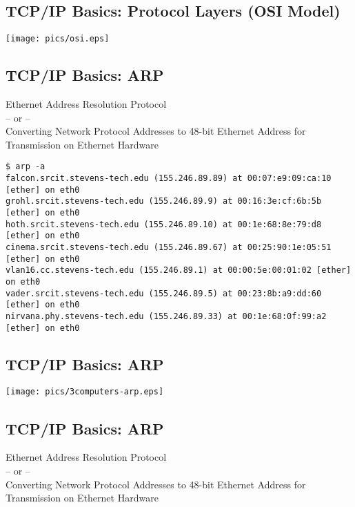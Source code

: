 \documentclass[xga]{xdvislides}
\begin{document}
\subsection{TCP/IP Basics: Protocol Layers (OSI Model)}
\vspace*{\fill}
\begin{center}
	\texttt{[image: pics/osi.eps]}
\end{center}
\vspace*{\fill}

\subsection{TCP/IP Basics: ARP}
\begin{center}
Ethernet Address Resolution Protocol \\
-- or -- \\
Converting Network Protocol Addresses to 48-bit Ethernet Address for Transmission on Ethernet Hardware
\end{center}

\begin{verbatim}
$ arp -a
falcon.srcit.stevens-tech.edu (155.246.89.89) at 00:07:e9:09:ca:10 [ether] on eth0
grohl.srcit.stevens-tech.edu (155.246.89.9) at 00:16:3e:cf:6b:5b [ether] on eth0
hoth.srcit.stevens-tech.edu (155.246.89.10) at 00:1e:68:8e:79:d8 [ether] on eth0
cinema.srcit.stevens-tech.edu (155.246.89.67) at 00:25:90:1e:05:51 [ether] on eth0
vlan16.cc.stevens-tech.edu (155.246.89.1) at 00:00:5e:00:01:02 [ether] on eth0
vader.srcit.stevens-tech.edu (155.246.89.5) at 00:23:8b:a9:dd:60 [ether] on eth0
nirvana.phy.stevens-tech.edu (155.246.89.33) at 00:1e:68:0f:99:a2 [ether] on eth0
\end{verbatim}

\subsection{TCP/IP Basics: ARP}
\vspace*{\fill}
\begin{center}
	\texttt{[image: pics/3computers-arp.eps]}
\end{center}
\vspace*{\fill}


\subsection{TCP/IP Basics: ARP}
\begin{center}
Ethernet Address Resolution Protocol \\
-- or -- \\
Converting Network Protocol Addresses to 48-bit Ethernet Address for Transmission on Ethernet Hardware
\end{center}
\vspace{.2in}
\end{document}
